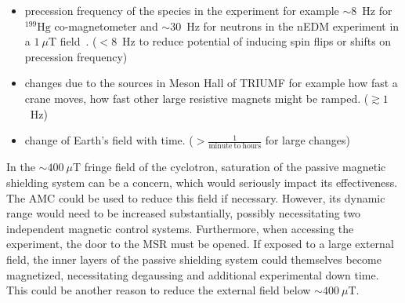 \begin{itemize}
    \item  precession frequency of the species in the experiment for example $\sim8$~Hz for $\mathrm{^{199}Hg}$ co-magnetometer and $\sim30$~Hz for neutrons in the nEDM experiment in a $1~\mu$T field~\cite{bea_paper}. ($<8$~Hz to reduce potential of inducing spin flips or shifts on precession frequency)
    \item  changes due to the sources in Meson Hall of TRIUMF for example how fast a crane moves, how fast other large resistive magnets might be ramped. ($\gtrsim1$~Hz)
    \item  change of Earth's field with time. ($>\frac{1}{\mathrm{minute~to~hours}}$ for large changes)
\end{itemize}






In the $\sim400~\mu$T fringe field of the cyclotron, saturation of the passive magnetic shielding system can be a concern, which would seriously impact its effectiveness. The AMC could be used to reduce this field if necessary. However, its dynamic range would need to be increased substantially, possibly necessitating two independent magnetic control systems. Furthermore, when accessing the experiment, the door to the MSR must be opened. If exposed to a large external field, the inner layers of the passive shielding system could themselves become magnetized, necessitating degaussing and additional experimental down time. This could be another reason to reduce the external field below $\sim400~\mu$T.

